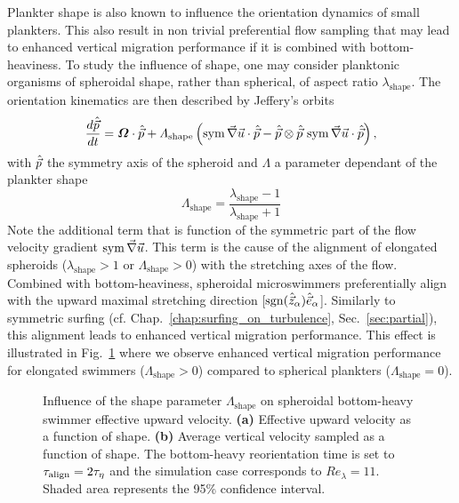 Plankter shape is also known to influence the orientation dynamics of small plankters.
This also result in non trivial preferential flow sampling that may lead to enhanced vertical migration performance if it is combined with bottom-heaviness.
To study the influence of shape, one may consider planktonic organisms of spheroidal shape, rather than spherical, of aspect ratio $\lambda_{\mathrm{shape}}$.
The orientation kinematics are then described by Jeffery's orbits \citep{jeffery_motion_1922}
\begin{equation}
    \frac{d \hat{\vec{p}}}{dt} = \boldsymbol{\varOmega} \cdot \hat{\vec{p}} + \varLambda_{\mathrm{shape}} \left( \operatorname{sym} \vec{\nabla} \vec{u} \cdot \hat{\vec{p}} - \hat{\vec{p}} \otimes \hat{\vec{p}} \, \operatorname{sym} \vec{\nabla} \vec{u} \cdot \hat{\vec{p}} \right),
\end{equation}
with $\hat{\vec{p}}$ the symmetry axis of the spheroid and $\varLambda$ a parameter dependant of the plankter shape
\begin{equation}
	\varLambda_{\mathrm{shape}} = \frac{\lambda_{\mathrm{shape}} - 1}{\lambda_{\mathrm{shape}} + 1}
\end{equation}
Note the additional term that is function of the symmetric part of the flow velocity gradient $\operatorname{sym} \vec{\nabla} \vec{u}$.
This term is the cause of the alignment of elongated spheroids ($\lambda_{\mathrm{shape}} > 1$ or $\varLambda_{\mathrm{shape}} > 0$) with the stretching axes of the flow.
Combined with bottom-heaviness, spheroidal microswimmers preferentially align with the upward maximal stretching direction [$\operatorname{sgn}(\hat{\vec{z}}_\alpha) \hat{\vec{e}}_{\alpha}$].
Similarly to symmetric surfing (cf. Chap.~\ref{chap:surfing_on_turbulence}, Sec.~\ref{sec:partial}), this alignment leads to enhanced vertical migration performance.
This effect is illustrated in Fig.~\ref{fig:passive_shape} where we observe enhanced vertical migration performance for elongated swimmers ($\varLambda_{\mathrm{shape}} > 0$) compared to spherical plankters ($\varLambda_{\mathrm{shape}} = 0$).
\begin{figure}%
	\centering
	
	\caption[Influence of the shape parameter $\varLambda_{\mathrm{shape}}$ on spheroidal bottom-heavy swimmer effective upward velocity.]{
		Influence of the shape parameter $\varLambda_{\mathrm{shape}}$ on spheroidal bottom-heavy swimmer effective upward velocity.
		\textbf{(a)} Effective upward velocity as a function of shape.
		\textbf{(b)} Average vertical velocity sampled as a function of shape.
		The bottom-heavy reorientation time is set to $\tau_{\mathrm{align}} = 2 \tau_{\eta}$ and the simulation case corresponds to $\mathit{Re}_{\lambda} = 11$.
		Shaded area represents the 95\% confidence interval.
	}
	\label{fig:passive_shape}
\end{figure}


